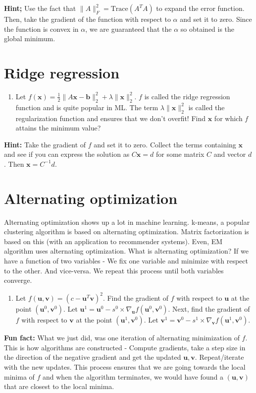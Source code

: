 \documentclass[twoside]{article}
\newcommand{\trace}{\mbox{Trace}}
\newcommand{\bb}{\mathbf{b}}
\newcommand{\bx}{\mathbf{x}}
\newcommand{\bu}{\mathbf{u}}
\newcommand{\bv}{\mathbf{v}}
\begin{document}
\textbf{Hint; } Use the fact that $\|A\|_F^2 = \trace(A^TA)$
to expand the error function. Then, take the gradient of the function with respect to $\alpha$ and set it to zero.  Since the function is
convex in $\alpha$, we are guaranteed that the $\alpha$ so obtained is the global minimum.

\section{Ridge regression}
\begin{enumerate}
\item{
Let $f(\bx) =  \frac{1}{2}\|A\bx - \bb\|_2^2 + \lambda \|\bx\|_2^2$. $f$ is called the ridge regression function and is quite popular in ML.
The term $\lambda \|\bx\|_2^2$ is called the regularization function and ensures that we don't overfit! Find $\bx$ for which $f$ attains the minimum value?}
\end{enumerate}

\textbf{Hint: } Take the gradient of $f$ and set it to zero. Collect the terms containing $\bx$ and see if you can express
the solution as $C\bx = d$ for some matrix $C$ and vector $d$. Then $\bx = C^{-1}d$.

\section{Alternating optimization}
Alternating optimization shows up a lot in machine learning. k-means, a popular clustering algorithm is based on alternating optimization.
Matrix factorization is based on this (with an application to recommender systems). Even, EM algorithm uses alternating optimization. What is alternating optimization? If we have
a function of two variables - We fix one variable and minimize with respect to the other. And vice-versa. We repeat this process until both variables converge. \\

\begin{enumerate}
\item{
Let $f(\bu,\bv) = (c - \bu^T\bv)^2$. Find the gradient of $f$ with respect to $\bu$ at the point $(\bu^0, \bv^0)$. Let $\bu^1 = \bu^0 - s^0 \times \nabla_{\bu} f(\bu^0, \bv^0)$.
Next, find the gradient of $f$ with respect to $\bv$ at the point $(\bu^1, \bv^0)$. Let $\bv^1 = \bv^0 - s^1 \times \nabla_{\bv} f(\bu^1, \bv^0)$. \\}
\end{enumerate}

\textbf{Fun fact:} What we just did, was one iteration of alternating minimization of $f$. This is how algorithms are constructed - Compute gradients, take a step size in
the direction of the negative gradient and get the updated $\bu, \bv$. Repeat/iterate with the new updates. This process ensures that we are going towards
the local minima of $f$ and when the algorithm terminates, we would have found a $(\bu, \bv)$ that are closest to the local minima.
\end{document}
